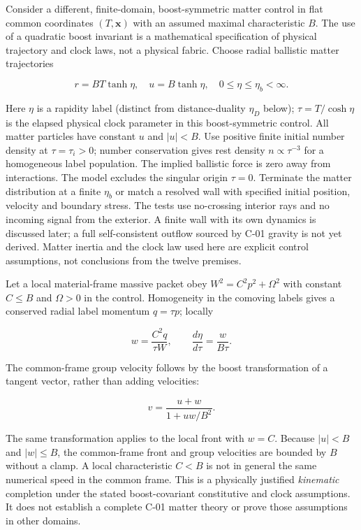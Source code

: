 \documentclass[
  11pt,
  twoside]{article}
\begin{document}
Consider a different, finite-domain, boost-symmetric matter control in
flat common coordinates \((T,\mathbf{x})\) with an assumed maximal
characteristic \(B\). The use of a quadratic boost invariant is a
mathematical specification of physical trajectory and clock laws, not a
physical fabric. Choose radial ballistic matter trajectories

\[r=B T\tanh\eta,\quad u=B\tanh\eta,\quad 0\leq\eta\leq\eta_b<\infty.\tag{R1}\]

Here \(\eta\) is a rapidity label (distinct from distance-duality
\(\eta_D\) below); \(\tau=T/\cosh\eta\) is the elapsed physical clock
parameter in this boost-symmetric control. All matter particles have
constant \(u\) and \(|u|<B\). Use positive finite initial number density
at \(\tau=\tau_i>0\); number conservation gives rest density
\(n\propto\tau^{-3}\) for a homogeneous label population. The implied
ballistic force is zero away from interactions. The model excludes the
singular origin \(\tau=0\). Terminate the matter distribution at a
finite \(\eta_b\) or match a resolved wall with specified initial
position, velocity and boundary stress. The tests use no-crossing
interior rays and no incoming signal from the exterior. A finite wall
with its own dynamics is discussed later; a full self-consistent outflow
sourced by C-01 gravity is not yet derived. Matter inertia and the clock
law used here are explicit control assumptions, not conclusions from the
twelve premises.

Let a local material-frame massive packet obey \(W^2=C^2p^2+\Omega^2\)
with constant \(C\leq B\) and \(\Omega>0\) in the control. Homogeneity
in the comoving labels gives a conserved radial label momentum
\(q=\tau p\); locally

\[w=\frac{C^2q}{\tau W},\qquad \frac{d\eta}{d\tau}=\frac{w}{B\tau}.\tag{R2}\]

The common-frame group velocity follows by the boost transformation of a
tangent vector, rather than adding velocities:

\[v=\frac{u+w}{1+uw/B^2}.\tag{R3}\]

The same transformation applies to the local front with \(w=C\). Because
\(|u|<B\) and \(|w|\leq B\), the common-frame front and group velocities
are bounded by \(B\) without a clamp. A local characteristic \(C<B\) is
not in general the same numerical speed in the common frame. This is a
physically justified \emph{kinematic} completion under the stated
boost-covariant constitutive and clock assumptions. It does not
establish a complete C-01 matter theory or prove those assumptions in
other domains.
\end{document}
